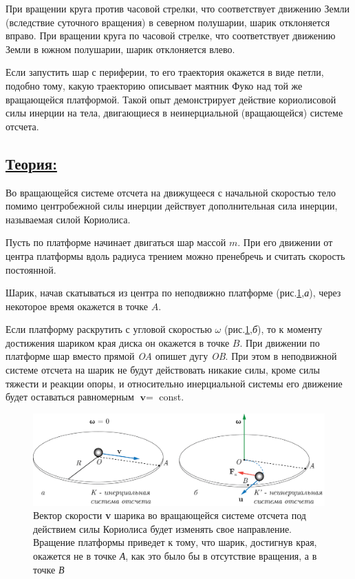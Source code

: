 \documentclass[14pt,a4paper,oneside]{extarticle}	%
\begin{document}
При вращении круга против часовой стрелки, что соответствует движению Земли 
(вследствие суточного вращения) в северном полушарии, шарик отклоняется вправо.
При вращении круга по часовой стрелке, что соответствует движению Земли в южном полушарии, шарик отклоняется влево.

Если запустить шар с периферии, то его траектория окажется в виде петли, подобно тому, какую траекторию описывает маятник Фуко над той же вращающейся платформой.
Такой опыт демонстрирует действие кориолисовой силы инерции на тела, двигающиеся в неинерциальной (вращающейся) системе отсчета.

\newpage
	\subsection*{\underline{Теория:}}
	
	Во вращающейся системе отсчета на движущееся с начальной скоростью тело помимо центробежной силы инерции действует дополнительная сила инерции, называемая силой Кориолиса.

	Пусть по платформе начинает двигаться шар массой $ m $.
При его движении от центра платформы вдоль радиуса трением можно пренебречь и считать скорость постоянной.
	
 Шарик, начав скатываться из центра по неподвижно платформе (рис.\ref{Coriolis-3},\textit{а}), через некоторое время окажется в точке $ A $.
		
	Если платформу раскрутить с угловой скоростью $ \omega $ (рис.\ref{Coriolis-3},\textit{б}), то к моменту достижения шариком края диска он окажется в точке $ B $.
	При движении по платформе шар вместо прямой \textit{OA} опишет дугу \textit{OB}.
	При этом в неподвижной системе отсчета на шарик не будут действовать никакие силы, кроме силы тяжести и реакции опоры, и относительно инерциальной системы его движение будет оставаться равномерным  $ \textbf{v} = $ const.
	
			\begin{figure}[H] 	
		\centering 	
		\includegraphics[width=0.9\linewidth]{Coriolis-3.png}
		\caption{Вектор скорости \textbf{v} шарика во вращающейся системе отсчета под действием силы Кориолиса будет изменять свое направление. Вращение платформы приведет к тому, что шарик, достигнув края, окажется не в точке \textit{А}, как это было бы в отсутствие вращения, а в точке \textit{В}}
		\label{Coriolis-3}
	\end{figure}
\end{document}
